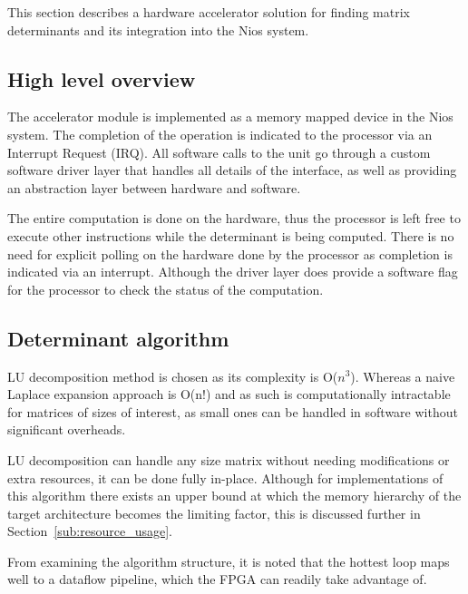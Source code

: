 \documentclass[]{article}
\begin{document}

This section describes a hardware accelerator solution for finding matrix determinants and its integration into the Nios system.

\subsection{High level overview} %
\label{sub:high_level_overview}

The accelerator module is implemented as a memory mapped device in the Nios system. The completion of the operation is indicated to the processor via an Interrupt Request (IRQ). All software calls to the unit go through a custom software driver layer that handles all details of the interface, as well as providing an abstraction layer between hardware and software. 

The entire computation is done on the hardware, thus the processor is left free to execute other instructions while the determinant is being computed. There is no need for explicit polling on the hardware done by the processor as completion is indicated via an interrupt. Although the driver layer does provide a software flag for the processor to check the status of the computation.

\subsection{Determinant algorithm} %
\label{sub:determinant_algortihm}

LU decomposition method is chosen as its complexity is O($n^3$). Whereas a naive Laplace expansion approach is O(n!) and as such is computationally intractable for matrices of sizes of interest, as small ones can be handled in software without significant overheads.

LU decomposition can handle any size matrix without needing modifications or extra resources, it can be done fully in-place. Although for implementations of this algorithm there exists an upper bound at which the memory hierarchy of the target architecture becomes the limiting factor, this is discussed further in Section~\ref{sub:resource_usage}.

From examining the algorithm structure, it is noted that the hottest loop maps well to a dataflow pipeline, which the FPGA can readily take advantage of.
\end{document}
